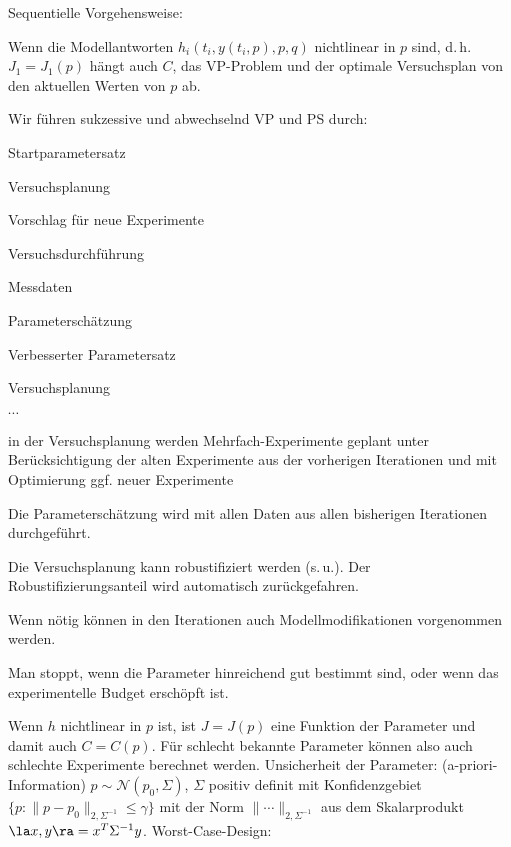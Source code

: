 Sequentielle Vorgehensweise:

Wenn die Modellantworten $h_i(t_i,y(t_i,p),p,q)$ nichtlinear in $p$ sind, d.\,h. $J_1 = J_1(p)$ hängt auch $C$, das VP-Problem und der optimale Versuchsplan von den aktuellen Werten von $p$ ab.

Wir führen sukzessive und abwechselnd VP und PS durch:

\bitm
\item Startparametersatz
\item Versuchsplanung
\item Vorschlag für neue Experimente
\item Versuchsdurchführung
\item Messdaten
\item Parameterschätzung
\item Verbesserter Parametersatz
\item Versuchsplanung
\item $\cdots$
\eitm


\bitm
\item in der Versuchsplanung werden Mehrfach-Experimente geplant unter Berücksichtigung der alten Experimente aus der vorherigen Iterationen und mit Optimierung ggf. neuer Experimente
\item Die Parameterschätzung wird mit allen Daten aus allen bisherigen Iterationen durchgeführt.
\item Die Versuchsplanung kann robustifiziert werden (s.\,u.). Der Robustifizierungsanteil wird automatisch zurückgefahren. 
\item Wenn nötig können in den Iterationen auch Modellmodifikationen vorgenommen werden.
\item Man stoppt, wenn die Parameter hinreichend gut bestimmt sind, oder wenn das experimentelle Budget erschöpft ist.
\eitm


Wenn $h$ nichtlinear in $p$ ist, ist $J = J(p)$ eine Funktion der Parameter und damit auch $C=C(p)$. Für schlecht bekannte Parameter können also auch schlechte Experimente berechnet werden.
Unsicherheit der Parameter: (a-priori-Information) $p\sim \mathcal N(p_0, \Sigma)$, $\Sigma$ positiv definit mit Konfidenzgebiet $\{p:\|p-p_0\|_{2,\Sigma^{-1}} \leq \gamma \}$ mit der Norm
$\|\cdots\|_{2,\Sigma^{-1}}$ aus dem Skalarprodukt $\la x,y\ra = x^T \Sigma^{-1} y$. Worst-Case-Design:

